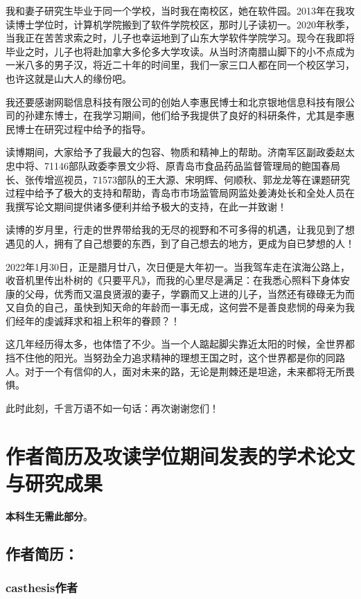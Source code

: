 我和妻子研究生毕业于同一个学校，当时我在南校区，她在软件园。2013年在我攻读博士学位时，计算机学院搬到了软件学院校区，那时儿子读初一。2020年秋季，当我正在苦苦求索之时，儿子也幸运地到了山东大学软件学院学习。现今在我即将毕业之时，儿子也将赴加拿大多伦多大学攻读。从当时济南腊山脚下的小不点成为一米八多的男子汉，将近二十年的时间里，我们一家三口人都在同一个校区学习，也许这就是山大人的缘份吧。

我还要感谢网聪信息科技有限公司的创始人李惠民博士和北京银地信息科技有限公司的孙建东博士，在我学习期间，他们给予我提供了良好的科研条件，尤其是李惠民博士在研究过程中给予的指导。

读博期间，大家给予了我最大的包容、物质和精神上的帮助。济南军区副政委赵太忠中将、71146部队政委李景文少将、原青岛市食品药品监督管理局的鲍国春局长、张传增巡视员，71573部队的王大源、宋明辉、何顺秋、郭龙龙等在课题研究过程中给予了极大的支持和帮助，青岛市市场监管局网监处姜涛处长和全处人员在我撰写论文期间提供诸多便利并给予极大的支持，在此一并致谢！

读博的岁月里，行走的世界带给我的无尽的视野和不可多得的机遇，让我见到了想遇见的人，拥有了自己想要的东西，到了自己想去的地方，更成为自已梦想的人！

2022年1月30日，正是腊月廿八，次日便是大年初一。当我驾车走在滨海公路上，收音机里传出朴树的《只要平凡》，而我的心里尽是满足：在我悉心照料下身体安康的父母，优秀而又温良贤淑的妻子，学霸而又上进的儿子，当然还有碌碌无为而又自负的自己，虽快到知天命的年龄而一事无成，这何尝不是善良悲悯的母亲为我们经年的虔诚拜求和祖上积年的眷顾？！

这几年经历得太多，也体悟了不少。当一个人踮起脚尖靠近太阳的时候，全世界都挡不住他的阳光。当努劲全力追求精神的理想王国之时，这个世界都是你的同路人。对于一个有信仰的人，面对未来的路，无论是荆棘还是坦途，未来都将无所畏惧。

此时此刻，千言万语不如一句话：再次谢谢您们！

\chapter{作者简历及攻读学位期间发表的学术论文与研究成果}

\textbf{本科生无需此部分}。

\section*{作者简历：}

\subsection*{casthesis作者}

